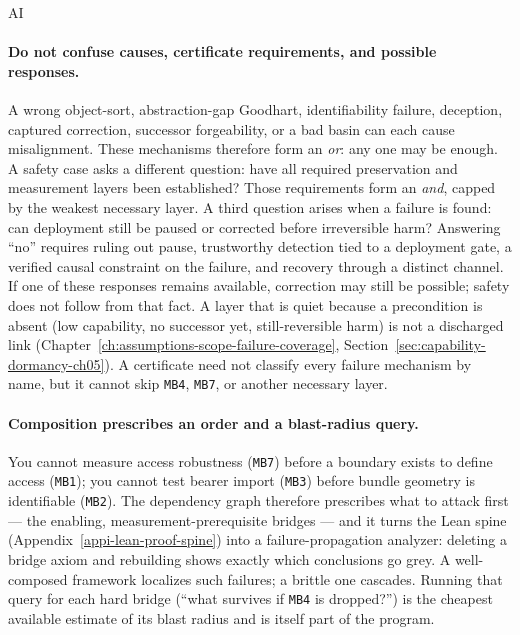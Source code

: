 \begin{authbar}{AI}
\paragraph{Do not confuse causes, certificate requirements, and possible responses.}
\label{par:problem-or-case-and}
A wrong object-sort, abstraction-gap Goodhart, identifiability failure, deception, captured correction, successor forgeability, or a bad basin can each cause misalignment.
These mechanisms therefore form an \emph{or}: any one may be enough.
A safety case asks a different question: have all required preservation and measurement layers been established?
Those requirements form an \emph{and}, capped by the weakest necessary layer.
A third question arises when a failure is found: can deployment still be paused or corrected before irreversible harm?
Answering ``no'' requires ruling out pause, trustworthy detection tied to a deployment gate, a verified causal constraint on the failure, and recovery through a distinct channel.
If one of these responses remains available, correction may still be possible; safety does not follow from that fact.
A layer that is quiet because a precondition is absent (low capability, no successor yet, still-reversible harm) is not a discharged link (Chapter~\ref{ch:assumptions-scope-failure-coverage}, Section~\ref{sec:capability-dormancy-ch05}).
A certificate need not classify every failure mechanism by name, but it cannot skip \texttt{MB4}, \texttt{MB7}, or another necessary layer.

\paragraph{Composition prescribes an order and a blast-radius query.}
You cannot measure access robustness (\texttt{MB7}) before a boundary exists to define access (\texttt{MB1}); you cannot test bearer import (\texttt{MB3}) before bundle geometry is identifiable (\texttt{MB2}).
The dependency graph therefore prescribes what to attack first --- the enabling, measurement-prerequisite bridges --- and it turns the Lean spine (Appendix~\ref{appi-lean-proof-spine}) into a failure-propagation analyzer: deleting a bridge axiom and rebuilding shows exactly which conclusions go grey.
A well-composed framework localizes such failures; a brittle one cascades.
Running that query for each hard bridge (``what survives if \texttt{MB4} is dropped?'') is the cheapest available estimate of its blast radius and is itself part of the program.

\end{authbar}
\authbarsubneedspace
